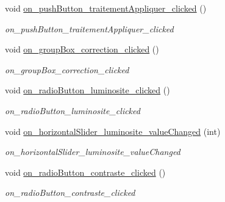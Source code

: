 \begin{DoxyCompactItemize}
\mbox{\label{classAppMainWindow_a28183f9ca4c7385aed673c258a89d272}} 
void \hyperlink{classAppMainWindow_a28183f9ca4c7385aed673c258a89d272}{on\+\_\+push\+Button\+\_\+traitement\+Appliquer\+\_\+clicked} ()
\begin{DoxyCompactList}\small\item\em on\+\_\+push\+Button\+\_\+traitement\+Appliquer\+\_\+clicked \end{DoxyCompactList}\item 
\mbox{\label{classAppMainWindow_a3fb09e5476491ccb373c3142568ea9b0}} 
void \hyperlink{classAppMainWindow_a3fb09e5476491ccb373c3142568ea9b0}{on\+\_\+group\+Box\+\_\+correction\+\_\+clicked} ()
\begin{DoxyCompactList}\small\item\em on\+\_\+group\+Box\+\_\+correction\+\_\+clicked \end{DoxyCompactList}\item 
\mbox{\label{classAppMainWindow_a1a387398116058b46cf8471ff4074f3d}} 
void \hyperlink{classAppMainWindow_a1a387398116058b46cf8471ff4074f3d}{on\+\_\+radio\+Button\+\_\+luminosite\+\_\+clicked} ()
\begin{DoxyCompactList}\small\item\em on\+\_\+radio\+Button\+\_\+luminosite\+\_\+clicked \end{DoxyCompactList}\item 
\mbox{\label{classAppMainWindow_abd9ddc7e5b68c639f077e7b5ae72427b}} 
void \hyperlink{classAppMainWindow_abd9ddc7e5b68c639f077e7b5ae72427b}{on\+\_\+horizontal\+Slider\+\_\+luminosite\+\_\+value\+Changed} (int)
\begin{DoxyCompactList}\small\item\em on\+\_\+horizontal\+Slider\+\_\+luminosite\+\_\+value\+Changed \end{DoxyCompactList}\item 
\mbox{\label{classAppMainWindow_a42e59487ad33350eebc89972af1061a7}} 
void \hyperlink{classAppMainWindow_a42e59487ad33350eebc89972af1061a7}{on\+\_\+radio\+Button\+\_\+contraste\+\_\+clicked} ()
\begin{DoxyCompactList}\small\item\em on\+\_\+radio\+Button\+\_\+contraste\+\_\+clicked \end{DoxyCompactList}\item 

\end{DoxyCompactItemize}
